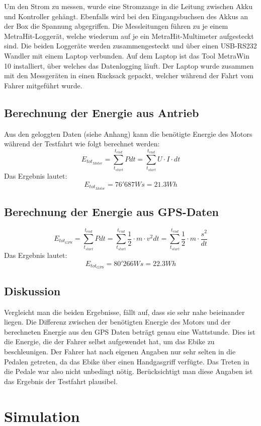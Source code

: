 \documentclass[a4,paper,fleqn]{article}
\begin{document}
\noindent
Um den Strom zu messen, wurde eine Stromzange in die Leitung zwischen Akku und 
Kontroller gehängt. Ebenfalls wird bei den Eingangsbuchsen des Akkus an der 
Box die Spannung abgegriffen. Die Messleitungen führen zu je einem 
MetraHit-Loggerät, welche wiederum auf je ein MetraHit-Multimeter aufgesteckt 
sind. Die beiden Loggeräte werden zusammengesteckt und über einen USB-RS232 
Wandler mit einem Laptop verbunden. Auf dem Laptop ist das Tool MetraWin 10 
installiert, über welches das Datenlogging läuft. Der Laptop wurde zusammen 
mit den Messgeräten in einen Rucksack gepackt, welcher während der Fahrt vom 
Fahrer mitgeführt wurde.

\subsection{Berechnung der Energie aus Antrieb}
Aus den geloggten Daten (siehe Anhang) kann die benötigte Energie des Motors 
während der Testfahrt wie folgt berechnet werden:
\[ E_{tot_{Motor}} = \sum\limits_{t_{start}}^{t_{end}} P dt 
= \sum\limits_{t_{start}}^{t_{end}}  U \cdot I \cdot dt \]
Das Ergebnis lautet: 
\[ E_{tot_{Motor}} = 76'687 Ws = 21.3 Wh \]

\subsection{Berechnung der Energie aus GPS-Daten}
\[ E_{tot_{GPS}} = \sum\limits_{t_{start}}^{t_{end}} P dt 
= \sum\limits_{t_{start}}^{t_{end}} \frac{1}{2} \cdot m \cdot v^2 dt
= \sum\limits_{t_{start}}^{t_{end}} \frac{1}{2} \cdot m \cdot \frac{s^2}{dt} \]
Das Ergebnis lautet:
\[ E_{tot_{GPS}} = 80'266Ws = 22.3Wh \]

\subsection{Diskussion}
Vergleicht man die beiden Ergebnisse, fällt auf, dass sie sehr nahe beieinander 
liegen. Die Differenz zwischen der benötigten Energie des Motors und der 
berechneten Energie aus den GPS Daten beträgt genau eine Wattstunde. Dies ist 
die Energie, die der Fahrer selbst aufgewendet hat, um das Ebike zu 
beschleunigen. Der Fahrer hat nach eigenen Angaben nur sehr selten in die 
Pedalen getreten, da das Ebike über einen Handgasgriff verfügte. Das Treten in 
die Pedale war also nicht unbedingt nötig. Berücksichtigt man diese Angaben 
ist das Ergebnis der Testfahrt plausibel.

\section{Simulation}
\end{document}
